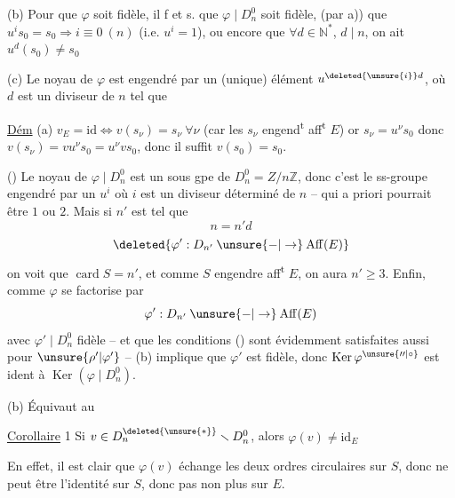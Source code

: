 (b) Pour que $\varphi$ soit fidèle, il f et s. que $\varphi\mid D_n^0$ soit fidèle,   (par a)) que $u^i s_0=s_0\Longrightarrow i\equiv0\ (n)$ (i.e. $u^i=1$), ou encore que $\forall d\in{\mathbb N}^*$, $d\mid n$, on ait $u^d(s_0)\ne s_0$ 

(c)  Le noyau de $\varphi$  est  engendré par un (unique) élément $u^{\deleted{\unsure{i}}d}$, où  $d$ est un diviseur de $n$ tel que  

\uline{Dém} (a) $v_E=\mathrm{id}\iff v(s_{\nu})=s_\nu\ \forall\nu$ (car les $s_\nu$ engend\textsuperscript{t} aff\textsuperscript{t} $E$) or $s_\nu=u^\nu s_0$ donc $v(s_\nu)=vu^\nu s_0=u^\nu v s_0$, donc il suffit $v(s_0)=s_0$.

()  Le noyau de $\varphi\mid D_n^0$ est un sous gpe de $D_n^0=Z/n\mathbb Z$, donc  c'est le ss-groupe engendré par un $u^i$ où $i$ est un diviseur  déterminé de $n$ --  qui a priori pourrait être $1$ ou $2$. Mais si  $n'$ est tel que
\[
n=n'd
\]
\[
\deleted{\varphi':D_{n'}\mathbin{\unsure{-|\to}}\mathrm{Aff}(E)}
\]
on voit que  $\operatorname{card}S=n'$,  et comme $S$ engendre aff\textsuperscript{t} $E$, on aura $n'\geq3$. Enfin, comme $\varphi$ se factorise par
\[
\varphi':D_{n'}\mathbin{\unsure{-|\to}}\mathrm{Aff}(E)
\]
avec $\varphi'\mid D_n^0$ \unsure{$^{\bullet}$} fidèle -- et que les conditions () sont évidemment satisfaites aussi pour $\unsure{\rho'|\varphi'}$ -- (b) implique que $\varphi'$ est fidèle, donc $\operatorname{Ker}\varphi^{\unsure{\prime\prime|\circ}}$ est ident à $\operatorname{Ker}(\varphi\mid D_n^0)$.

(b)   Équivaut au

\uline{Corollaire} 1 Si $v\in D_n^{\deleted{\unsure{*}}}\smallsetminus D_n^0$, alors $\varphi(v)\ne\mathrm{id}_E$

En effet,  il est clair que $\varphi(v)$ échange les deux ordres circulaires  sur $S$,   donc ne peut être l'identité sur $S$, donc pas non plus sur $E$.

